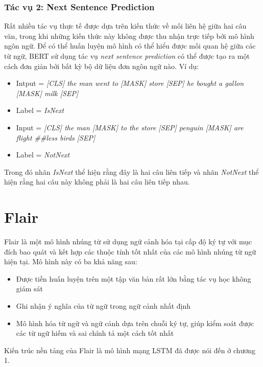 \documentclass[14pt]{extreport}
\begin{document}
\subsubsection{Tác vụ 2: Next Sentence Prediction}
Rất nhiều tác vụ thực tế được dựa trên kiến thức về mối liên hệ giữa hai câu văn, trong khi những kiến thức này không được thu nhận trực tiếp bởi mô hình ngôn ngữ. Để có thể huấn luyện mô hình có thể hiểu được mối quan hệ giữa các từ ngữ, BERT sử dụng tác vụ \textit{next sentence prediction} có thể được tạo ra một cách đơn giản bởi bất kỳ bộ dữ liệu đơn ngôn ngữ nào. Ví dụ:
\begin{itemize}
    \item Intput = \textit{[CLS] the man went to [MASK] store [SEP] he bought a gallon [MASK] milk [SEP]}
    \item Label = \textit{IsNext}
    \item Input = \textit{[CLS] the man [MASK] to the store [SEP] penguin [MASK] are flight \#\#less birds [SEP]}
    \item Label = \textit{NotNext}
\end{itemize}
Trong đó nhãn \textit{IsNext} thể hiện rằng đây là hai câu liên tiếp và nhãn \textit{NotNext} thể hiện rằng hai câu này không phải là hai câu liên tiếp nhau. 



\section{Flair}
Flair là một mô hình nhúng từ sử dụng ngữ cảnh hóa tại cấp độ ký tự với mục đích bao quát và kết hợp các thuộc tính tốt nhất của các mô hình nhúng từ ngữ hiện tại. Mô hình này có ba khả năng sau:
\begin{itemize}
    \item Được tiền huấn luyện trên một tập văn bản rất lớn bằng tác vụ học không giám sát
    \item Ghi nhận ý nghĩa của từ ngữ trong ngữ cảnh nhất định
    \item Mô hình hóa từ ngữ và ngữ cảnh dựa trên chuỗi ký tự, giúp kiểm soát được các từ ngữ hiếm và sai chính tả một cách tốt nhất
\end{itemize}
Kiến trúc nền tảng của Flair là mô hình mạng LSTM đã được nói đến ở chương 1.
\end{document}
